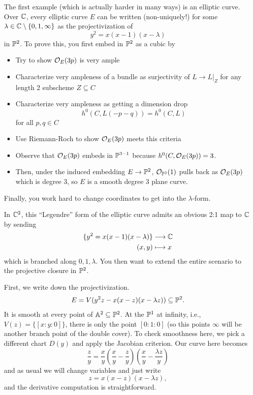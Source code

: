 \documentclass[12pt]{article}
\begin{document}
The first example (which is actually harder in many ways) is an elliptic curve. Over $\C$, every elliptic curve $E$ can be written (non-uniquely!) for some $\lambda\in \C\setminus\{0,1,\infty\}$ as the projectivization of
\[y^2 = x(x-1)(x-\lambda)\]
in $\P^2$. To prove this, you first embed in $\P^2$ as a cubic by
\begin{itemize}
    \item Try to show $\cO_E(3p)$ is very ample
    \item Characterize very ampleness of a bundle as surjectivity of $L \to L|_Z$ for any length 2 subscheme $Z\subseteq C$
    \item Characterize very ampleness as getting a dimension drop
    \[h^0(C,L(-p-q)) = h^0(C,L)\]
    for all $p,q\in C$
    \item Use Riemann-Roch to show $\cO_E(3p)$ meets this criteria
    \item Observe that $\cO_E(3p)$ embeds in $\P^{3-1}$ because $h^0(C,\cO_E(3p)) = 3$.
    \item Then, under the induced embedding $E\to \P^2$, $\cO_{\P^2}(1)$ pulls back as $\cO_E(3p)$ which is degree 3, so $E$ is a smooth degree 3 plane curve.
\end{itemize}
Finally, you work hard to change coordinates to get into the $\lambda$-form.

In $\C^2$, this ``Legendre'' form of the elliptic curve admits an obvious 2:1 map to $\C$ by sending
\begin{align*}
    \{y^2=x(x-1)(x-\lambda)\} &\longrightarrow \C\\
    (x,y) &\longmapsto x
\end{align*}
which is branched along $0,1,\lambda$. You then want to extend the entire scenario to the projective closure in $\P^2$.

First, we write down the projectivization.
\[E = V(y^2z - x(x-z)(x-\lambda z)) \subseteq \P^2.\]
It is smooth at every point of $\A^2 \subseteq \P^2$. At the $\P^1$ at infinity, i.e., $V(z) = \{[x:y:0]\}$, there is only the point $[0:1:0]$ (so this points $\infty$ will be another branch point of the double cover). To check smoothness here, we pick a different chart $D(y)$ and apply the Jacobian criterion. Our curve here becomes
\begin{equation}\label{other-coords}
    \frac{z}{y} = \frac{x}{y}\left(\frac{x}{y}-\frac{z}{y}\right)\left(\frac{x}{y} - \frac{\lambda z}{y}\right)
\end{equation}
and as usual we will change variables and just write
\[z = x(x-z)(x-\lambda z),\]
and the derivative computation is straightforward.
\end{document}
